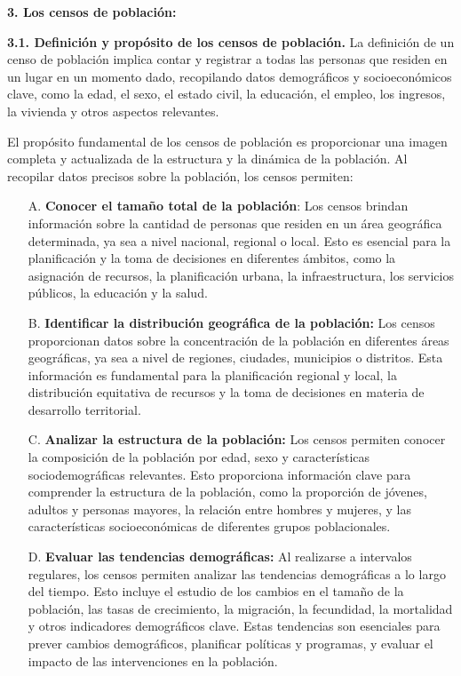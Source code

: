 \documentclass[8pt,a4paper]{beamer}
\begin{document}
{\begin{frame}{\textbf{3. Los censos de población:}}
\begin{block}{\textbf{3.1. Definición y propósito de los censos de población.}}
La definición de un censo de población implica contar y registrar a todas las personas que residen en un lugar en un momento dado, recopilando datos demográficos y socioeconómicos clave, como la edad, el sexo, el estado civil, la educación, el empleo, los ingresos, la vivienda y otros aspectos relevantes.

El propósito fundamental de los censos de población es proporcionar una imagen completa y actualizada de la estructura y la dinámica de la población. Al recopilar datos precisos sobre la población, los censos permiten:
\begin{enumerate}
\justifying
\item[A.] \textbf{Conocer el tamaño total de la población}: Los censos brindan información sobre la cantidad de personas que residen en un área geográfica determinada, ya sea a nivel nacional, regional o local. Esto es esencial para la planificación y la toma de decisiones en diferentes ámbitos, como la asignación de recursos, la planificación urbana, la infraestructura, los servicios públicos, la educación y la salud.
\end{enumerate}
\end{block}
\end{frame}

\begin{frame}{}
\begin{block}{}
\begin{enumerate}
\justifying
\item[B.] \textbf{Identificar la distribución geográfica de la población:} Los censos proporcionan datos sobre la concentración de la población en diferentes áreas geográficas, ya sea a nivel de regiones, ciudades, municipios o distritos. Esta información es fundamental para la planificación regional y local, la distribución equitativa de recursos y la toma de decisiones en materia de desarrollo territorial.
\item[C.] \textbf{Analizar la estructura de la población:} Los censos permiten conocer la composición de la población por edad, sexo y características sociodemográficas relevantes. Esto proporciona información clave para comprender la estructura de la población, como la proporción de jóvenes, adultos y personas mayores, la relación entre hombres y mujeres, y las características socioeconómicas de diferentes grupos poblacionales.
\item[D.] \textbf{Evaluar las tendencias demográficas:} Al realizarse a intervalos regulares, los censos permiten analizar las tendencias demográficas a lo largo del tiempo. Esto incluye el estudio de los cambios en el tamaño de la población, las tasas de crecimiento, la migración, la fecundidad, la mortalidad y otros indicadores demográficos clave. Estas tendencias son esenciales para prever cambios demográficos, planificar políticas y programas, y evaluar el impacto de las intervenciones en la población.
\end{enumerate}
\end{block}
\end{frame}

}
\end{document}
